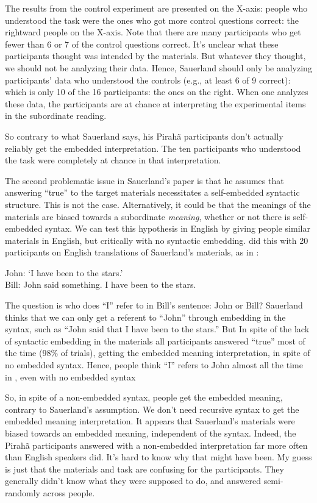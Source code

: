 \documentclass{article}
\begin{document}
The results from the control experiment are presented on the X-axis:  people who understood the task were the ones who got more control questions correct: the rightward people on the X-axis.  Note that there are many participants who get fewer than 6 or 7 of the control questions correct.  It's unclear what these participants thought was intended by the materials.  But whatever they thought, we should not be analyzing their data. Hence, Sauerland should only be analyzing participants’ data who understood the controls (e.g., at least 6 of 9 correct):  which is only 10 of the 16 participants: the ones on the right. When one analyzes these data, the participants are at chance at interpreting the experimental items in the subordinate reading.

So contrary to what Sauerland says, his Pirahã participants don’t actually reliably get the embedded interpretation. The ten participants who understood the task were completely at chance in that interpretation.

The second problematic issue in Sauerland's paper is that he assumes that answering ``true'' to the target materials necessitates a self-embedded syntactic structure.  This is not the case.  Alternatively, it could be that the meanings of the materials are biased towards a subordinate \textit{meaning}, whether or not there is self-embedded syntax.  We can test this hypothesis in English by giving people similar materials in English, but critically with no syntactic embedding.  \cite{everett2019recursion} did this with 20 participants on English translations of Sauerland's materials, as in : 

\ea
\label{ev_gib2019_ex}
John: ‘I have been to the stars.’\\
Bill: John said something. I have been to the stars.
\z

The question is who does ``I'' refer to in Bill’s sentence:  John or Bill? Sauerland thinks that we can only get a referent to ``John'' through embedding in the syntax, such as ``John said that I have been to the stars.''  But In spite of the lack of syntactic embedding in the materials all participants answered ``true'' most of the time (98\% of trials), getting the embedded meaning interpretation, in spite of no embedded syntax.  Hence, people think ``I'' refers to John almost all the time in , even with no embedded syntax

So, in spite of a non-embedded syntax, people get the embedded meaning, contrary to Sauerland’s assumption.  We don’t need recursive syntax to get the embedded meaning interpretation.  It appears that Sauerland's materials were biased towards an embedded meaning, independent of the syntax. Indeed, the Pirahã participants answered with a non-embedded interpretation far more often than English speakers did. It's hard to know why that might have been.  My guess is just that the materials and task are confusing for the participants.  They generally didn't know what they were supposed to do, and answered semi-randomly across people.
\end{document}
